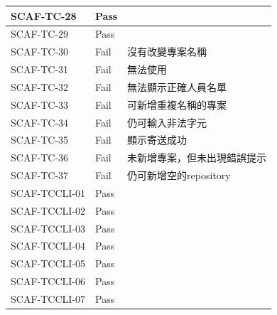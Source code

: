 \documentclass{report}
\begin{document}
\begin{tabularx}{\textwidth}{
  |p{}%
  |p{}%
  |p{}|%
}
  \hline
  SCAF-TC-28 & Pass &  \\ \hline
  SCAF-TC-29 & Pass &  \\ \hline
  SCAF-TC-30 & Fail & 沒有改變專案名稱 \\ \hline
  SCAF-TC-31 & Fail & 無法使用 \\ \hline
  SCAF-TC-32 & Fail & 無法顯示正確人員名單 \\ \hline
  SCAF-TC-33 & Fail & 可新增重複名稱的專案 \\ \hline
  SCAF-TC-34 & Fail & 仍可輸入非法字元 \\ \hline
  SCAF-TC-35 & Fail & 顯示寄送成功 \\ \hline
  SCAF-TC-36 & Fail & 未新增專案，但未出現錯誤提示 \\ \hline
  SCAF-TC-37 & Fail & 仍可新增空的repository \\ \hline
  SCAF-TCCLI-01 & Pass &  \\ \hline
  SCAF-TCCLI-02 & Pass &  \\ \hline
  SCAF-TCCLI-03 & Pass &  \\ \hline
  SCAF-TCCLI-04 & Pass &  \\ \hline
  SCAF-TCCLI-05 & Pass &  \\ \hline
  SCAF-TCCLI-06 & Pass &  \\ \hline
  SCAF-TCCLI-07 & Pass &  \\ \hline
\end{tabularx}
\\
\newline
\\
\end{document}
